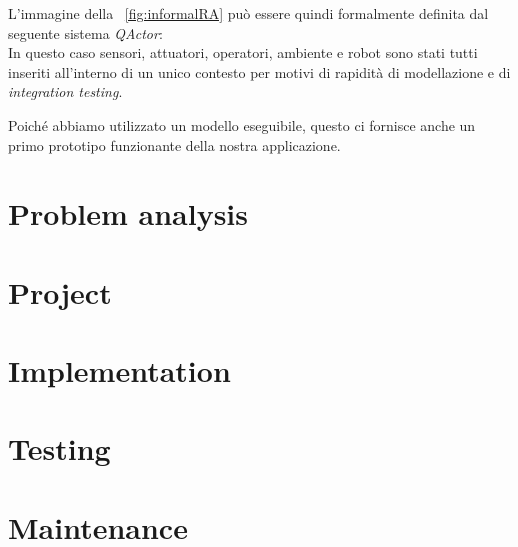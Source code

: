 \documentclass{../llncs}
\newcommand{\qa}{\textsf{\textit{QActor}}}
\newcommand{\labelsec}[1]{\label{sec:#1}}
\newcommand{\xf}[1]{\figurename~\ref{fig:#1}}
\begin{document}
L'immagine della \xf{informalRA} può essere quindi formalmente definita dal seguente sistema {\qa}:\\



In questo caso sensori, attuatori, operatori, ambiente e robot sono stati tutti inseriti all'interno di un unico contesto per motivi di rapidità di modellazione e di \textit{integration testing}.

Poiché abbiamo utilizzato un modello eseguibile, questo ci fornisce anche un primo prototipo funzionante della nostra applicazione.


\section{Problem analysis}
\labelsec{ProblemAnalysis}

\section{Project}
\labelsec{Project}

\section{Implementation}
\labelsec{Implementation}

\section{Testing}
\labelsec{Testing}

\section{Maintenance}
\labelsec{Maintenance}
\end{document}

